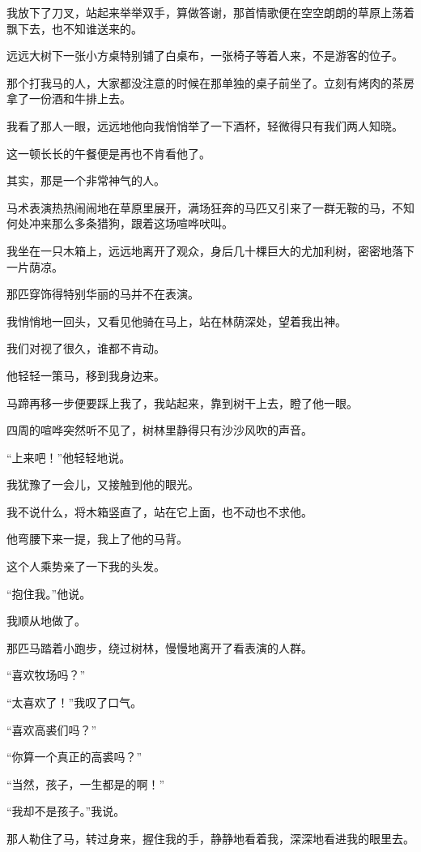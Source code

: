 \par 我放下了刀叉，站起来举举双手，算做答谢，那首情歌便在空空朗朗的草原上荡着飘下去，也不知谁送来的。
\par 远远大树下一张小方桌特别铺了白桌布，一张椅子等着人来，不是游客的位子。
\par 那个打我马的人，大家都没注意的时候在那单独的桌子前坐了。立刻有烤肉的茶房拿了一份酒和牛排上去。
\par 我看了那人一眼，远远地他向我悄悄举了一下酒杯，轻微得只有我们两人知晓。
\par 这一顿长长的午餐便是再也不肯看他了。
\par 其实，那是一个非常神气的人。
\par 马术表演热热闹闹地在草原里展开，满场狂奔的马匹又引来了一群无鞍的马，不知何处冲来那么多条猎狗，跟着这场喧哗吠叫。
\par 我坐在一只木箱上，远远地离开了观众，身后几十棵巨大的尤加利树，密密地落下一片荫凉。
\par 那匹穿饰得特别华丽的马并不在表演。
\par 我悄悄地一回头，又看见他骑在马上，站在林荫深处，望着我出神。
\par 我们对视了很久，谁都不肯动。
\par 他轻轻一策马，移到我身边来。
\par 马蹄再移一步便要踩上我了，我站起来，靠到树干上去，瞪了他一眼。
\par 四周的喧哗突然听不见了，树林里静得只有沙沙风吹的声音。
\par “上来吧！”他轻轻地说。
\par 我犹豫了一会儿，又接触到他的眼光。
\par 我不说什么，将木箱竖直了，站在它上面，也不动也不求他。
\par 他弯腰下来一提，我上了他的马背。
\par 这个人乘势亲了一下我的头发。
\par “抱住我。”他说。
\par 我顺从地做了。
\par 那匹马踏着小跑步，绕过树林，慢慢地离开了看表演的人群。
\par “喜欢牧场吗？”
\par “太喜欢了！”我叹了口气。
\par “喜欢高裘们吗？”
\par “你算一个真正的高裘吗？”
\par “当然，孩子，一生都是的啊！”
\par “我却不是孩子。”我说。
\par 那人勒住了马，转过身来，握住我的手，静静地看着我，深深地看进我的眼里去。
